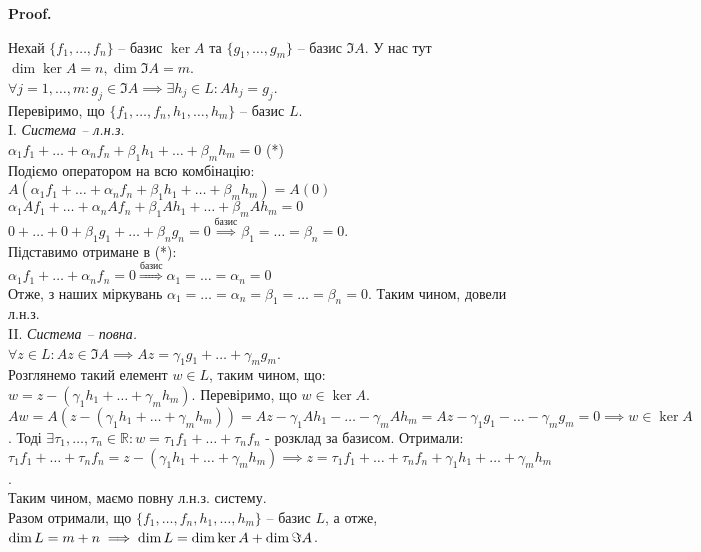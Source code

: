 \documentclass[a4paper, 10pt]{article}
\makeatletter
\theoremstyle{theoremdd}
\renewenvironment{proof}[1][Proof.\\]{\par
\pushQED{\hfill \qed}%
\normalfont \topsep6\p@\@plus6\p@\relax
\trivlist
\item\relax
{\bfseries
#1\@addpunct{.}}\hspace\labelsep\ignorespaces
}{%
\popQED\endtrivlist\@endpefalse
}
\makeatother
\begin{document}
	\begin{proof}
	Нехай $\{f_1, \dots, f_n\}$ -- базис $\ker A$ та $\{g_1, \dots, g_m\}$ -- базис $\Im A$. У нас тут $\dim \ker A = n, \dim \Im A = m$.\\
	$\forall j = 1,\dots,m: g_j \in \Im A \implies \exists h_j \in L: Ah_j = g_j$.\\
	Перевіримо, що $\{f_1,\dots, f_n, h_1,\dots, h_m\}$ -- базис $L$.
	\bigskip \\
	I. \textit{Система -- л.н.з.}\\
	$\alpha_1 f_1 + \dots + \alpha_n f_n + \beta_1 h_1 + \dots + \beta_m h_m = 0$ (*)\\
	Подіємо оператором на всю комбінацію:\\
	$A(\alpha_1 f_1 + \dots + \alpha_n f_n + \beta_1 h_1 + \dots + \beta_m h_m) = A(0)$\\
	$\alpha_1 Af_1 + \dots + \alpha_n Af_n + \beta_1 Ah_1 + \dots + \beta_m A h_m = 0$\\
	$0 + \dots + 0 + \beta_1 g_1 + \dots + \beta_n g_n = 0 \overset{\textrm{базис}}{\implies} \beta_1 = \dots = \beta_n = 0$.\\
	Підставимо отримане в (*):\\
	$\alpha_1 f_1 + \dots + \alpha_n f_n = 0 \overset{\textrm{базис}}{\Rightarrow} \alpha_1 = \dots = \alpha_n = 0$\\
	Отже, з наших міркувань $\alpha_1 = \dots = \alpha_n = \beta_1 = \dots = \beta_n = 0$. Таким чином, довели л.н.з.
	\bigskip \\
	II. \textit{Система -- повна.}\\
	$\forall z \in L: Az \in \Im A \implies Az = \gamma_1 g_1 + \dots + \gamma_m g_m$.\\
	Розглянемо такий елемент $w \in L$, таким чином, що: $w = z - (\gamma_1 h_1 + \dots + \gamma_m h_m)$. Перевіримо, що $w \in \ker A$.\\
	$Aw = A(z - (\gamma_1 h_1 + \dots + \gamma_m h_m)) = Az - \gamma_1 Ah_1 - \dots - \gamma_m Ah_m = Az - \gamma_1 g_1 - \dots - \gamma_m g_m = 0 \implies w \in \ker A$. Тоді $\exists \tau_1, \dots, \tau_n \in \mathbb{R}: w = \tau_1 f_1 + \dots + \tau_n f_n$ - розклад за базисом. Отримали:\\
	$\tau_1 f_1 + \dots + \tau_n f_n = z - (\gamma_1 h_1 + \dots + \gamma_m h_m) \implies z = \tau_1 f_1 + \dots + \tau_n f_n + \gamma_1 h_1 + \dots + \gamma_m h_m$.\\
	Таким чином, маємо повну л.н.з. систему.
	\bigskip \\
	Разом отримали, що $\{f_1,\dots, f_n, h_1,\dots, h_m\}$ -- базис $L$, а отже, $\dim L = m+n \\ \implies \dim L = \dim \ker A + \dim \Im A$.
	\end{proof}
	
\end{document}
